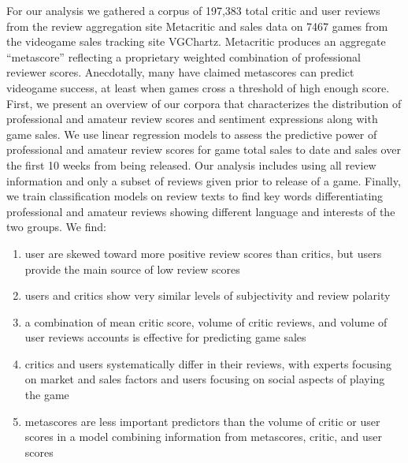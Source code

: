 \documentclass[letterpaper]{article}
\begin{document}
For our analysis we gathered a corpus of 197,383 total critic and user reviews from the review aggregation site Metacritic and sales data on 7467 games from the videogame sales tracking site VGChartz. Metacritic produces an aggregate ``metascore'' reflecting a proprietary weighted combination of professional reviewer scores. Anecdotally, many have claimed metascores can predict videogame success, at least when games cross a threshold of high enough score. First, we present an overview of our corpora that characterizes the distribution of professional and amateur review scores and sentiment expressions along with game sales. We use linear regression models to assess the predictive power of professional and amateur review scores for game total sales to date and sales over the first 10 weeks from being released. Our analysis includes using all review information and only a subset of reviews given prior to release of a game. Finally, we train classification models on review texts to find key words differentiating professional and amateur reviews showing different language and interests of the two groups. We find:
\begin{enumerate}
\item user are skewed toward more positive review scores than critics, but users provide the main source of low review scores
\item users and critics show very similar levels of subjectivity and review polarity
\item a combination of mean critic score, volume of critic reviews, and volume of user reviews accounts is effective for predicting game sales
\item critics and users systematically differ in their reviews, with experts focusing on market and sales factors and users focusing on social aspects of playing the game
\item metascores are less important predictors than the volume of critic or user scores in a model combining information from metascores, critic, and user scores
\end{enumerate}
\end{document}
